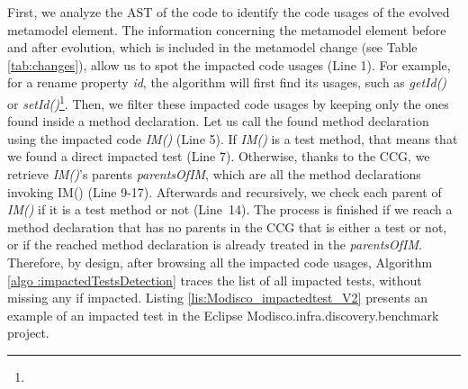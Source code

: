 First, we analyze the AST of the code to identify the code usages of the evolved metamodel element. The information concerning the metamodel element before and after evolution, which is included in the metamodel change (see Table \ref{tab:changes}), allow us to spot the impacted code usages (Line 1). For example, for a rename property \emph{id}, the algorithm will first find its usages, such as \emph{getId()} or \emph{setId()}\footnote{}. 
%
Then, we filter these impacted code usages by keeping only the ones found inside a method declaration. %
Let us call the found method declaration using the impacted code \textit{IM()} (Line 5). If \textit{IM()} is a test method, that means that we found a direct impacted test (Line 7). Otherwise, thanks to the CCG, we retrieve \textit{IM()}'s parents \emph{parentsOfIM}, which are all the method declarations invoking IM() (Line 9-17). 
%
Afterwards and recursively, we check each parent of \textit{IM()} if it is a test method or not (Line~14). The process is finished if we reach a method declaration that has no parents in the CCG that is either a test or not, or if the reached method declaration is already treated in the \emph{parentsOfIM}. Therefore, by design, after browsing all the impacted code usages, Algorithm \ref{algo :impactedTestsDetection} traces the list of all impacted tests, without missing any if impacted.  
Listing \ref{lis:Modisco_impactedtest_V2} presents an example of an impacted test in the Eclipse Modisco.infra.discovery.benchmark project. 

